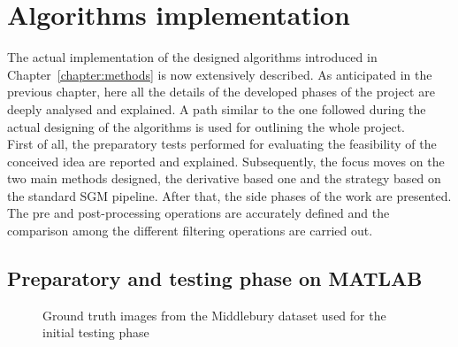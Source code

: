 \chapter{Algorithms implementation}
\label{chapter:implementation}

The actual implementation of the designed algorithms introduced in Chapter~\ref{chapter:methods} is now extensively described. 
As anticipated in the previous chapter, here all the details of the developed phases of the project are deeply analysed and explained. 
A path similar to the one followed during the actual designing of the algorithms is used for outlining the whole project.\\
First of all, the preparatory tests performed for evaluating the feasibility of the conceived idea are reported and explained. 
Subsequently, the focus moves on the two main methods designed, the derivative based one and the strategy based on the standard SGM pipeline.
After that, the side phases of the work are presented. 
The pre and post-processing operations are accurately defined and the comparison among the different filtering operations are carried out.

\section{Preparatory and testing phase on MATLAB}
\label{section:prep-pahse-matlab}

\begin{figure}[t]
	\centering
\caption{Ground truth images from the Middlebury dataset used for the initial testing phase}
\label{fig:test-matlab-01}
\end{figure}


